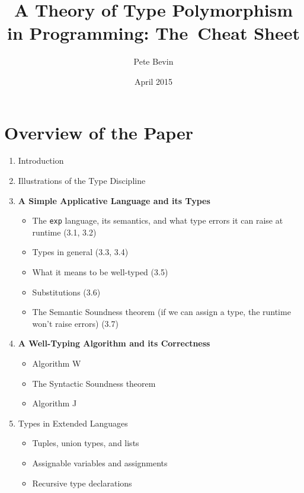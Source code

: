 \documentclass[12pt]{article}
\begin{document}

\title{A Theory of Type Polymorphism in Programming: The~Cheat Sheet}
\author{Pete Bevin}
\date{April 2015}
\maketitle

\section{Overview of the Paper}
\begin{enumerate}
\item Introduction
\item Illustrations of the Type Discipline
\item \textbf{A Simple Applicative Language and its Types}
  \begin{itemize}
  \item The \texttt{exp} language, its semantics, and what type errors it can raise at runtime (3.1, 3.2)
  \item Types in general (3.3, 3.4)
  \item What it means to be well-typed (3.5)
  \item Substitutions (3.6)
  \item The Semantic Soundness theorem (if we can assign a type, the runtime won't raise errors) (3.7)
  \end{itemize}
\item \textbf{A Well-Typing Algorithm and its Correctness}
  \begin{itemize}
  \item Algorithm W
  \item The Syntactic Soundness theorem
  \item Algorithm J
  \end{itemize}
\item Types in Extended Languages
  \begin{itemize}
  \item Tuples, union types, and lists
  \item Assignable variables and assignments
  \item Recursive type declarations
  \end{itemize}
\end{enumerate}
\end{document}
